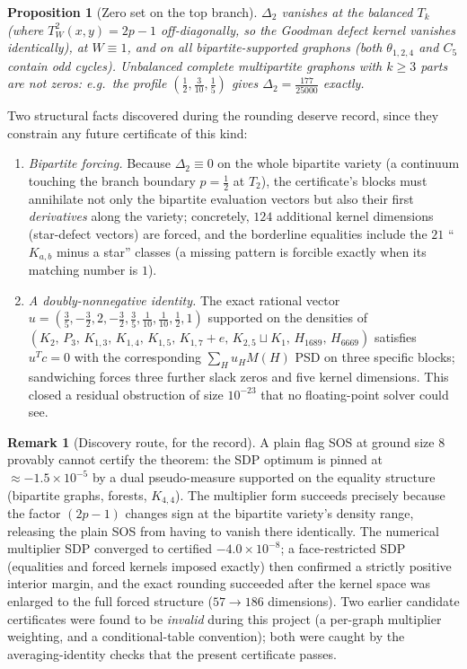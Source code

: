 \documentclass[11pt]{article}
\newtheorem{proposition}[theorem]{Proposition}
\theoremstyle{definition}
\newtheorem{remark}[theorem]{Remark}
\newcommand{\tw}{T_W}
\newcommand{\thet}{\theta_{1,2,4}}
\begin{document}
\begin{proposition}[Zero set on the top branch]\label{prop:zeros}
$\Delta_2$ vanishes at the balanced $T_k$ \textup{(}where
$\tw^2(x,y)=2p-1$ off-diagonally, so the Goodman defect kernel vanishes
identically\textup{)}, at $W\equiv1$, and on all bipartite-supported graphons
\textup{(}both $\thet$ and $C_5$ contain odd cycles\textup{)}.  Unbalanced
complete multipartite graphons with $k\ge3$ parts are \emph{not} zeros: e.g.\
the profile $(\tfrac12,\tfrac3{10},\tfrac15)$ gives
$\Delta_2=\tfrac{177}{25000}$ exactly.
\end{proposition}

Two structural facts discovered during the rounding deserve record, since they
constrain any future certificate of this kind:
\begin{enumerate}[leftmargin=1.6em]
\item \emph{Bipartite forcing.}  Because $\Delta_2\equiv0$ on the whole
bipartite variety (a continuum touching the branch boundary $p=\tfrac12$ at
$T_2$), the certificate's blocks must annihilate not only the bipartite
evaluation vectors but also their first \emph{derivatives} along the variety;
concretely, $124$ additional kernel dimensions (star-defect vectors) are
forced, and the borderline equalities include the $21$ ``$K_{a,b}$ minus a
star'' classes (a missing pattern is forcible exactly when its matching number
is $1$).
\item \emph{A doubly-nonnegative identity.}  The exact rational vector
$u=(\tfrac35,-\tfrac32,2,-\tfrac32,\tfrac35,\tfrac1{10},\tfrac1{10},\tfrac12,1)$
supported on the densities of
$(K_2,\,P_3,\,K_{1,3},\,K_{1,4},\,K_{1,5},\,K_{1,7}{+}e,\,K_{2,5}{\sqcup}K_1,\,
H_{1689},\,H_{6669})$ satisfies $u^{T}c=0$ with the corresponding
$\sum_H u_H M(H)$ PSD on three specific blocks; sandwiching forces three
further slack zeros and five kernel dimensions.  This closed a residual
obstruction of size $10^{-23}$ that no floating-point solver could see.
\end{enumerate}

\begin{remark}[Discovery route, for the record]
A plain flag SOS at ground size $8$ provably cannot certify the theorem: the
SDP optimum is pinned at $\approx-1.5\times10^{-5}$ by a dual pseudo-measure
supported on the equality structure (bipartite graphs, forests, $K_{4,4}$).
The multiplier form succeeds precisely because the factor $(2p-1)$ changes
sign at the bipartite variety's density range, releasing the plain SOS from
having to vanish there identically.  The numerical multiplier SDP converged to
certified $-4.0\times10^{-8}$; a face-restricted SDP (equalities and forced
kernels imposed exactly) then confirmed a strictly positive interior margin,
and the exact rounding succeeded after the kernel space was enlarged to the
full forced structure ($57\to186$ dimensions).  Two earlier candidate
certificates were found to be \emph{invalid} during this project (a per-graph
multiplier weighting, and a conditional-table convention); both were caught by
the averaging-identity checks that the present certificate passes.
\end{remark}
\end{document}
